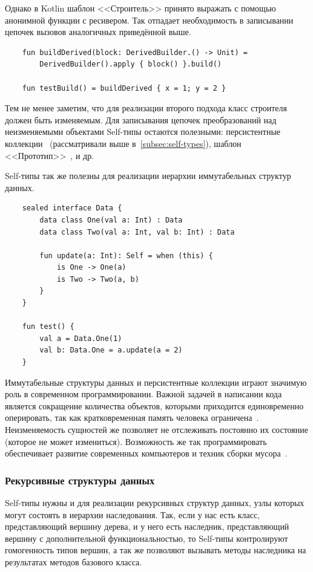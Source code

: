 Однако в Kotlin шаблон <<Строитель>> принято выражать с помощью анонимной функции с ресивером.
Так отпадает необходимость в записывании цепочек вызовов аналогичных приведённой выше.

\begin{verbatim}
    fun buildDerived(block: DerivedBuilder.() -> Unit) =
        DerivedBuilder().apply { block() }.build()

    fun testBuild() = buildDerived { x = 1; y = 2 }
\end{verbatim}

Тем не менее заметим, что для реализации второго подхода класс строителя должен быть изменяемым.
Для записывания цепочек преобразований над неизменяемыми объектами Self-типы остаются полезными: персистентные коллекции~\cite{okasaki1999purely} (рассматривали выше в~\ref{subsec:self-types}), шаблон <<Прототип>>~\cite{hannemann2002design}, и др.

Self-типы так же полезны для реализации иерархии иммутабельных структур данных.

\begin{verbatim}
    sealed interface Data {
        data class One(val a: Int) : Data
        data class Two(val a: Int, val b: Int) : Data

        fun update(a: Int): Self = when (this) {
            is One -> One(a)
            is Two -> Two(a, b)
        }
    }

    fun test() {
        val a = Data.One(1)
        val b: Data.One = a.update(a = 2)
    }
\end{verbatim}

Иммутабельные структуры данных и персистентные коллекции играют значимую роль в современном программировании.
Важной задачей в написании кода является сокращение количества объектов, которыми приходится единовременно оперировать, так как кратковременная память человека ограничена~\cite{lisman1995storage}.
Неизменяемость сущностей же позволяет не отслеживать постоянно их состояние (которое не может измениться).
Возможность же так программировать обеспечивает развитие современных компьютеров и техник сборки мусора~\cite{jones2016garbage}.

\subsubsection{Рекурсивные структуры данных}

Self-типы нужны и для реализации рекурсивных структур данных, узлы которых могут состоять в иерархии наследования.
Так, если у нас есть класс, представляющий вершину дерева, и у него есть наследник, представляющий вершину с дополнительной функциональностью, то Self-типы контролируют гомогенность типов вершин, а так же позволяют вызывать методы наследника на результатах методов базового класса.

